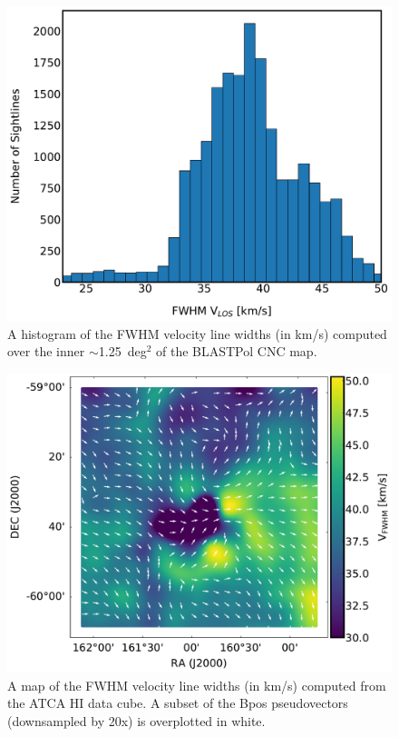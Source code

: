 \begin{figure}[!htbp]
\centering
\includegraphics[width=\textwidth]{figures/carina/VLOS_hist}
\caption[A histogram of the FWHM velocity line widths computed over the inner  of the BLASTPol CNC map.]{A histogram of the FWHM velocity line widths (in km/s) computed over the inner $\sim$1.25~deg$^{2}$ of the BLASTPol CNC map.}
\label{fig:vfwhm_hist}
\end{figure}

\begin{figure}[!htbp]
\centering
\includegraphics[width=\textwidth]{figures/carina/VFWHM_vectors}
\caption[A map of the FWHM velocity line widths computed from the ATCA HI data cube.]{A map of the FWHM velocity line widths (in km/s) computed from the ATCA $\mathrm{HI}$ data cube. A subset of the \gls{Bpos} pseudovectors (downsampled by 20x) is overplotted in white.}
\label{fig:vfwhm_map}
\end{figure}

